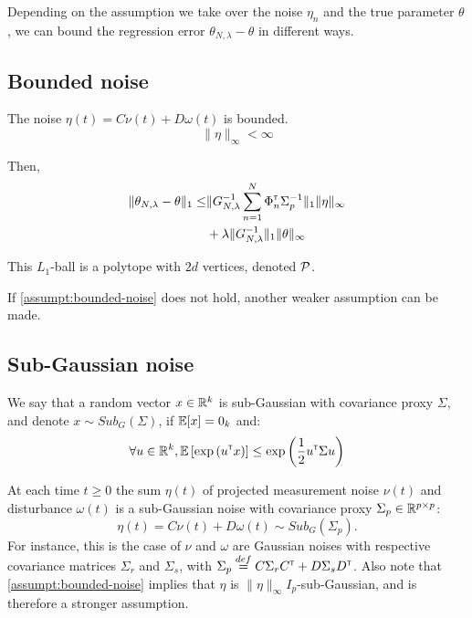 \documentclass{article}
\begin{document}
Depending on the assumption we take over the noise $\eta_n$ and the true parameter $\theta$, we can bound the regression error $\theta_{N,\lambda} - \theta$ in different ways.


\subsection{Bounded noise}

\begin{assumption}
\label{assumpt:bounded-noise}
The noise $\eta(t) = C\nu(t) + D\omega(t)$ is bounded.
\[\|\eta\|_\infty < \infty\]
\end{assumption}

Then, 
\begin{align}
\|\theta_{N,\lambda} - \theta\|_1 \leq &\|G_{N, \lambda}^{-1}\sum_{n=1}^N \Phi_n^{\mathsf{\scriptscriptstyle T}} \Sigma_p^{-1}\|_1\|\eta\|_\infty \\
&+ \lambda\|G_{N, \lambda}^{-1}\|_1\|\theta\|_\infty \nonumber
\end{align}

This $L_1$-ball is a polytope with $2d$ vertices, denoted $\mathcal{P}$.

If \autoref{assumpt:bounded-noise} does not hold, another weaker assumption can be made.

\subsection{Sub-Gaussian noise}

We say that a random vector $x\in\mathbb{R}^k$ is sub-Gaussian with covariance proxy $\Sigma$, and denote $x\sim Sub_G(\Sigma)$, if $\operatorname*{\mathbb{E}}[x] = 0_k$ and:
\[
\forall u\in\mathbb{R}^k, \operatorname*{\mathbb{E}} \left[ \exp{\left( u^{\mathsf{\scriptscriptstyle T}}x\right)}\right] \leq \exp{\left( \frac{1}{2} u^{\mathsf{\scriptscriptstyle T}}\Sigma u\right)}
\]

\begin{assumption}
\label{assumpt:gaussian-noise}
At each time $t\geq0$ the sum $\eta(t)$ of projected measurement noise $\nu(t)$ and disturbance $\omega(t)$ is a sub-Gaussian noise with covariance proxy $\Sigma_p \in \mathbb{R}^{p\times p}$:
\begin{equation*}
    \eta(t) = C\nu(t) + D\omega(t) \sim Sub_G(\Sigma_p).
\end{equation*}
For instance, this is the case of $\nu$ and $\omega$ are Gaussian noises with respective covariance matrices $\Sigma_r$ and $\Sigma_s$, with $\Sigma_p \stackrel{def}{=} C\Sigma_r C^{\mathsf{\scriptscriptstyle T}} + D\Sigma_s D^{\mathsf{\scriptscriptstyle T}}$. Also note that \autoref{assumpt:bounded-noise} implies that $\eta$ is $\|\eta\|_\infty I_p$-sub-Gaussian, and is therefore a stronger assumption.
\end{assumption}
\end{document}
